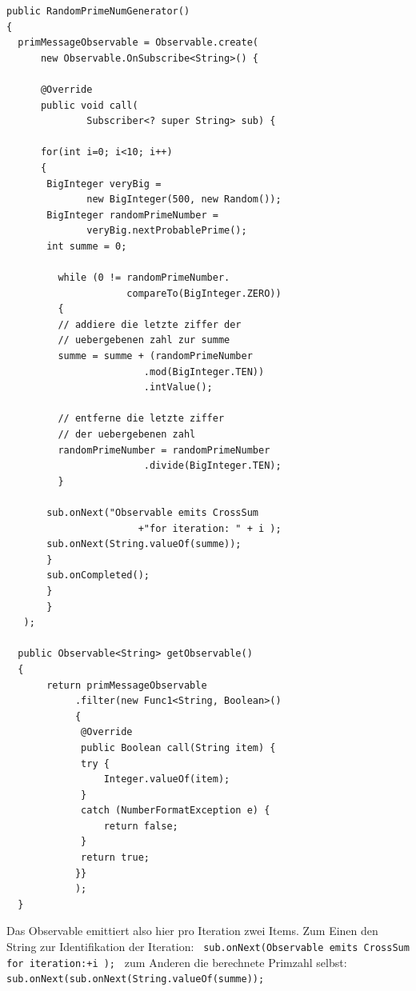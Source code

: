 \documentclass[12pt,oneside,a4paper,bibtotoc,liststotoc]{scrreprt}
\begin{document}
\begin{lstlisting}
public RandomPrimeNumGenerator()
{
  primMessageObservable = Observable.create(
      new Observable.OnSubscribe<String>() {
               
      @Override
      public void call(
              Subscriber<? super String> sub) {
               
      for(int i=0; i<10; i++)
      {
       BigInteger veryBig = 
              new BigInteger(500, new Random());
       BigInteger randomPrimeNumber = 
              veryBig.nextProbablePrime();
       int summe = 0;
       
         while (0 != randomPrimeNumber.
                     compareTo(BigInteger.ZERO)) 
         {
         // addiere die letzte ziffer der 
         // uebergebenen zahl zur summe
         summe = summe + (randomPrimeNumber
                        .mod(BigInteger.TEN))
                        .intValue();
                        
         // entferne die letzte ziffer 
         // der uebergebenen zahl
         randomPrimeNumber = randomPrimeNumber
                        .divide(BigInteger.TEN);
         }

       sub.onNext("Observable emits CrossSum
                       +"for iteration: " + i );
       sub.onNext(String.valueOf(summe));
       }
       sub.onCompleted();
       }
       }
   );

  public Observable<String> getObservable()
  {
       return primMessageObservable
            .filter(new Func1<String, Boolean>() 
            {
             @Override
             public Boolean call(String item) {
             try {
                 Integer.valueOf(item);
             } 
             catch (NumberFormatException e) {
                 return false;
             }
             return true;
            }}
            );
  }
\end{lstlisting}
Das Observable emittiert also hier pro Iteration zwei Items. Zum Einen den String zur Identifikation der Iteration:\newline
\texttt{\newline
sub.onNext(\grqq Observable emits CrossSum for iteration:\grqq +i );\newline
}\newline
zum Anderen die berechnete Primzahl selbst:\newline
\texttt{\newline
sub.onNext(sub.onNext(String.valueOf(summe));\newline
}\newline
\end{document}
